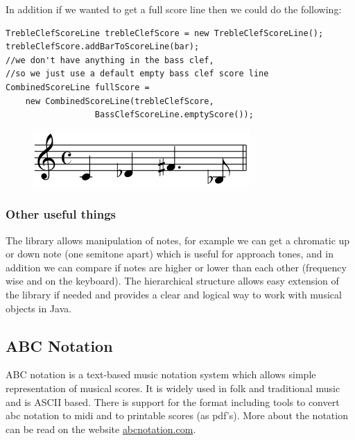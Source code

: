 \documentclass[pdftex,12pt,a4paper]{report}
\begin{document}
In addition if we wanted to get a full score line then we could do the following:

\begin{lstlisting}
TrebleClefScoreLine trebleClefScore = new TrebleClefScoreLine();
trebleClefScore.addBarToScoreLine(bar);
//we don't have anything in the bass clef, 
//so we just use a default empty bass clef score line
CombinedScoreLine fullScore = 
	new CombinedScoreLine(trebleClefScore, 
			      BassClefScoreLine.emptyScore());

\end{lstlisting}

\begin{figure}[here]
  \centering
  \includegraphics[scale=0.6]{figure/abcnotationexample.png}
  \label{fig:abcnotationexample}
\end{figure}

\subsubsection{Other useful things}
The library allows manipulation of notes, for example we can get a chromatic up or down note (one semitone apart) which is useful for approach tones, and in addition we can compare if notes are higher or lower than each other (frequency wise and on the keyboard). The hierarchical structure allows easy extension of the library if needed and provides a clear and logical way to work with musical objects in Java.

\subsection{ABC Notation} \label{abcnotation}
ABC notation is a text-based music notation system which allows simple representation of musical scores. It is widely used in folk and traditional music and is ASCII based. There is support for the format including tools to convert abc notation to midi and to printable scores (as pdf's). More about the notation can be read on the website \url{abcnotation.com}.
\end{document}
